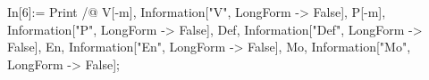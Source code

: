 In[6]:= Print /@ {V[-m], Information["V", LongForm -> False], P[-m], Information["P", LongForm -> False], Def, Information["Def", LongForm -> False], En, Information["En", LongForm -> False], Mo, Information["Mo", LongForm -> False]}; 